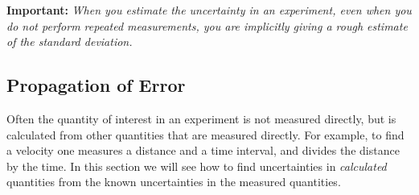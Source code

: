 {\bf Important:}  {\em When you estimate the uncertainty in an experiment,
even when you do not perform repeated measurements, you are
implicitly giving a rough estimate of the standard deviation.}

\subsection*{Propagation of Error}
     Often the quantity of interest in an experiment is not
measured directly, but is calculated from other quantities that
are measured directly.  For example, to find a velocity one
measures a distance and a time interval, and divides the distance by
the
time.  In this section we will see how to find uncertainties in
{\em calculated} quantities from the known uncertainties in the
measured quantities.


